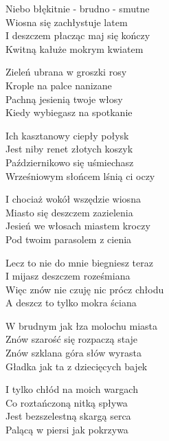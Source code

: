 \begin{text}
    Niebo błękitnie - brudno - smutne\\
    Wiosna się zachłystuje latem\\
    I deszczem płacząc maj się kończy\\
    Kwitną kałuże mokrym kwiatem

    Zieleń ubrana w groszki rosy\\
    Krople na palce nanizane\\
    Pachną jesienią twoje włosy\\
    Kiedy wybiegasz na spotkanie

    Ich kasztanowy ciepły połysk\\
    Jest niby renet złotych koszyk\\
    Październikowo się uśmiechasz\\
    Wrześniowym słońcem lśnią ci oczy

    I chociaż wokół wszędzie wiosna\\
    Miasto się deszczem zazielenia\\
    Jesień we włosach miastem kroczy\\
    Pod twoim parasolem z cienia

    Lecz to nie do mnie biegniesz teraz\\
    I mijasz deszczem roześmiana\\
    Więc znów nie czuję nic prócz chłodu\\
    A deszcz to tylko mokra ściana

    W brudnym jak łza molochu miasta\\
    Znów szarość się rozpaczą staje\\
    Znów szklana góra słów wyrasta\\
    Gładka jak ta z dziecięcych bajek

    I tylko chłód na moich wargach\\
    Co roztańczoną nitką spływa\\
    Jest bezszelestną skargą serca\\
    Palącą w piersi jak pokrzywa
\end{text}
\begin{chord}

\end{chord}